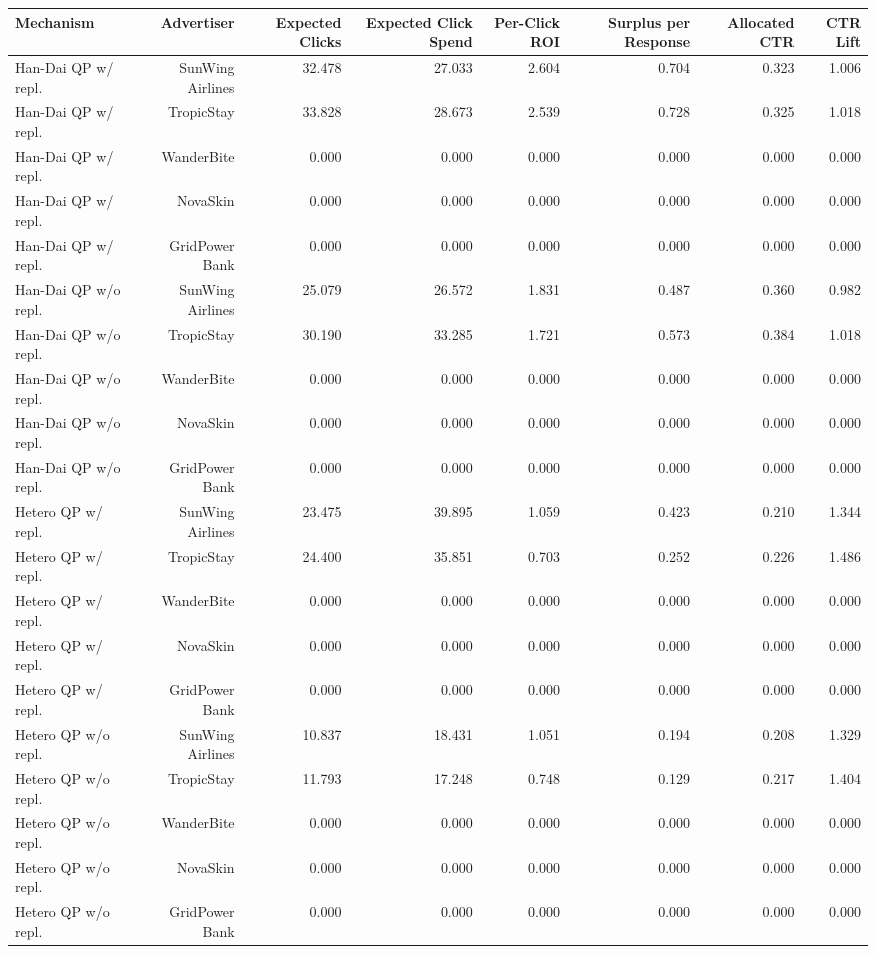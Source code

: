 \begin{tabular}{lrrrrrrr}
\hline
Mechanism & Advertiser & Expected Clicks & Expected Click Spend & Per-Click ROI & Surplus per Response & Allocated CTR & CTR Lift \\
\hline
Han-Dai QP w/ repl. & SunWing Airlines & 32.478 & 27.033 & 2.604 & 0.704 & 0.323 & 1.006 \\
Han-Dai QP w/ repl. & TropicStay & 33.828 & 28.673 & 2.539 & 0.728 & 0.325 & 1.018 \\
Han-Dai QP w/ repl. & WanderBite & 0.000 & 0.000 & 0.000 & 0.000 & 0.000 & 0.000 \\
Han-Dai QP w/ repl. & NovaSkin & 0.000 & 0.000 & 0.000 & 0.000 & 0.000 & 0.000 \\
Han-Dai QP w/ repl. & GridPower Bank & 0.000 & 0.000 & 0.000 & 0.000 & 0.000 & 0.000 \\
Han-Dai QP w/o repl. & SunWing Airlines & 25.079 & 26.572 & 1.831 & 0.487 & 0.360 & 0.982 \\
Han-Dai QP w/o repl. & TropicStay & 30.190 & 33.285 & 1.721 & 0.573 & 0.384 & 1.018 \\
Han-Dai QP w/o repl. & WanderBite & 0.000 & 0.000 & 0.000 & 0.000 & 0.000 & 0.000 \\
Han-Dai QP w/o repl. & NovaSkin & 0.000 & 0.000 & 0.000 & 0.000 & 0.000 & 0.000 \\
Han-Dai QP w/o repl. & GridPower Bank & 0.000 & 0.000 & 0.000 & 0.000 & 0.000 & 0.000 \\
Hetero QP w/ repl. & SunWing Airlines & 23.475 & 39.895 & 1.059 & 0.423 & 0.210 & 1.344 \\
Hetero QP w/ repl. & TropicStay & 24.400 & 35.851 & 0.703 & 0.252 & 0.226 & 1.486 \\
Hetero QP w/ repl. & WanderBite & 0.000 & 0.000 & 0.000 & 0.000 & 0.000 & 0.000 \\
Hetero QP w/ repl. & NovaSkin & 0.000 & 0.000 & 0.000 & 0.000 & 0.000 & 0.000 \\
Hetero QP w/ repl. & GridPower Bank & 0.000 & 0.000 & 0.000 & 0.000 & 0.000 & 0.000 \\
Hetero QP w/o repl. & SunWing Airlines & 10.837 & 18.431 & 1.051 & 0.194 & 0.208 & 1.329 \\
Hetero QP w/o repl. & TropicStay & 11.793 & 17.248 & 0.748 & 0.129 & 0.217 & 1.404 \\
Hetero QP w/o repl. & WanderBite & 0.000 & 0.000 & 0.000 & 0.000 & 0.000 & 0.000 \\
Hetero QP w/o repl. & NovaSkin & 0.000 & 0.000 & 0.000 & 0.000 & 0.000 & 0.000 \\
Hetero QP w/o repl. & GridPower Bank & 0.000 & 0.000 & 0.000 & 0.000 & 0.000 & 0.000 \\
\hline
\end{tabular}
